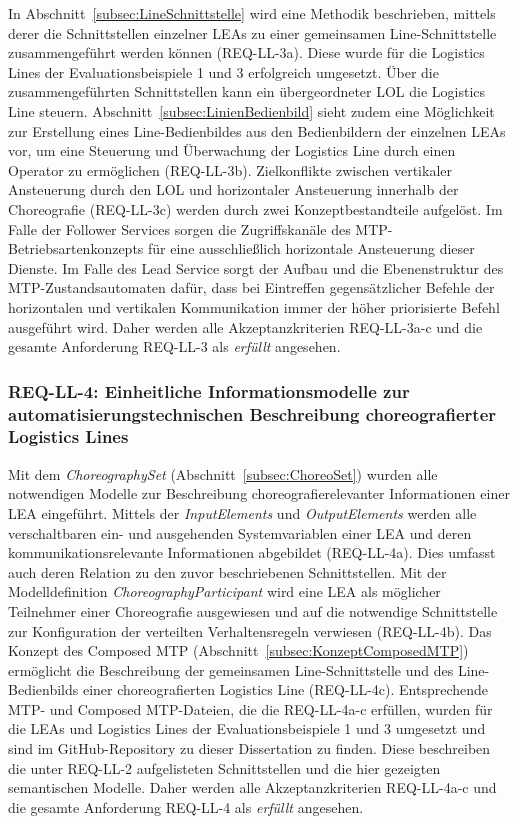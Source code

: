 In Abschnitt~\ref{subsec:LineSchnittstelle} wird eine Methodik beschrieben, mittels derer die Schnittstellen einzelner LEAs zu einer gemeinsamen Line-Schnittstelle zusammengeführt werden können (REQ-LL-3a). Diese wurde für die Logistics Lines der Evaluationsbeispiele 1 und 3 erfolgreich umgesetzt. Über die zusammengeführten Schnittstellen kann ein übergeordneter LOL die Logistics Line steuern. Abschnitt~\ref{subsec:LinienBedienbild} sieht zudem eine Möglichkeit zur Erstellung eines Line-Bedienbildes aus den Bedienbildern der einzelnen LEAs vor, um eine Steuerung und Überwachung der Logistics Line durch einen Operator zu ermöglichen (REQ-LL-3b). Zielkonflikte zwischen vertikaler Ansteuerung durch den LOL und horizontaler Ansteuerung innerhalb der Choreografie (REQ-LL-3c) werden durch zwei Konzeptbestandteile aufgelöst. Im Falle der Follower Services sorgen die Zugriffskanäle des MTP-Betriebsartenkonzepts für eine ausschließlich horizontale Ansteuerung dieser Dienste. Im Falle des Lead Service sorgt der Aufbau und die Ebenenstruktur des MTP-Zustandsautomaten dafür, dass bei Eintreffen gegensätzlicher Befehle der horizontalen und vertikalen Kommunikation immer der höher priorisierte Befehl ausgeführt wird. Daher werden alle Akzeptanzkriterien REQ-LL-3a-c und die gesamte Anforderung REQ-LL-3 als \emph{erfüllt} angesehen.

\subsubsection{REQ-LL-4: Einheitliche Informationsmodelle zur automatisierungstechnischen Beschreibung choreografierter Logistics Lines}

Mit dem \emph{ChoreographySet} (Abschnitt~\ref{subsec:ChoreoSet}) wurden alle notwendigen Modelle zur Beschreibung choreografierelevanter Informationen einer LEA eingeführt. Mittels der \emph{InputElements} und \emph{OutputElements} werden alle verschaltbaren ein- und ausgehenden Systemvariablen einer LEA und deren kommunikationsrelevante Informationen abgebildet (REQ-LL-4a). Dies umfasst auch deren Relation zu den zuvor beschriebenen Schnittstellen. Mit der Modelldefinition \emph{ChoreographyParticipant} wird eine LEA als möglicher Teilnehmer einer Choreografie ausgewiesen und auf die notwendige Schnittstelle zur Konfiguration der verteilten Verhaltensregeln verwiesen (REQ-LL-4b). Das Konzept des Composed MTP (Abschnitt~\ref{subsec:KonzeptComposedMTP}) ermöglicht die Beschreibung der gemeinsamen Line-Schnittstelle und des Line-Bedienbilds einer choreografierten Logistics Line (REQ-LL-4c). Entsprechende MTP- und Composed MTP-Dateien, die die REQ-LL-4a-c erfüllen, wurden für die LEAs und Logistics Lines der Evaluationsbeispiele 1 und 3 umgesetzt und sind im GitHub-Repository zu dieser Dissertation \cite{Blumenstein.Github} zu finden. Diese beschreiben die unter REQ-LL-2 aufgelisteten Schnittstellen und die hier gezeigten semantischen Modelle. Daher werden alle Akzeptanzkriterien REQ-LL-4a-c und die gesamte Anforderung REQ-LL-4 als \emph{erfüllt} angesehen.

